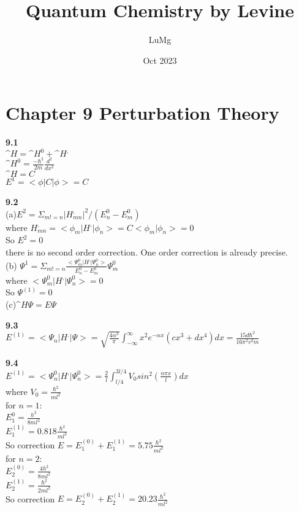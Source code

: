 \documentclass{article}
\title{Quantum Chemistry by Levine}
\author{LuMg}
\date{Oct 2023}
\begin{document}
\maketitle

\section{Chapter 9 Perturbation Theory}
\textbf{9.1}\\
$\^{H} = \^{H}^0+\^{H}^,$\\
$\^{H}^0 = \frac{-\hbar^2}{2m}\frac{d^2}{dx^2}$\\
$\^{H} = C$\\
$E^{1} = <\phi|C|\phi> = C$\\
\newline

\textbf{9.2}\\
(a)$E^{2} = \Sigma_{m!=n}|H^,_{mn}|^2/(E_n^0-E_m^0)$\\
where $H^,_{mn} = <\phi_m|H^,|\phi_n> = C<\phi_m|\phi_n> = 0$\\
So $E^{2} = 0$\\
there is no second order correction. One order correction is already precise.\\
\newline
(b) $\Psi^{1} = \Sigma_{m!=n}\frac{<\Psi_m^{0}|H^,|\Psi_n^0>}{E_n^0 - E_m^0}\Psi_m^0$\\
where $<\Psi_m^{0}|H^,|\Psi_n^0> = 0$\\
So $\Psi^{(1)} = 0$\\
\newline
(c)$\^{H}\Psi = E\Psi$\\
\newline

\textbf{9.3}\\
$E^{(1)} = <\Psi_n|H^,|\Psi> = \sqrt{\frac{4\alpha^3}{\pi}}\int_{-\infty}^{\infty}x^2e^{-\alpha x}(cx^3+dx^4)dx = \frac{15d\hbar^2}{16\pi^2v^2m}$\\
\newline

\textbf{9.4}\\
$E^{(1)} = <\Psi_n^{0}|H^,|\Psi_n^{0}> = \frac{2}{l}\int_{l/4}^{3l/4}V_0sin^2(\frac{n\pi x}{l})dx$\\
where $V_0 = \frac{\hbar^2}{ml^2}$\\
\newline
for $n = 1$:\\
$E_1^{0} = \frac{h^2}{8ml^2}$\\
$E_1^{(1)} = 0.818\frac{\hbar^2}{ml^2}$\\
So correction $E = E_1^{(0)}+E_1^{(1)} = 5.75\frac{\hbar^2}{ml^2}$\\
for $n = 2$:\\
$E_2^{(0)} = \frac{4h^2}{8ml^2}$\\
$E_2^{(1)} = \frac{\hbar^2}{2ml^2}$\\
So correction $E = E_2^{(0)}+E_2^{(1)} = 20.23\frac{\hbar^2}{ml^2}$\\
\newline
\end{document}
